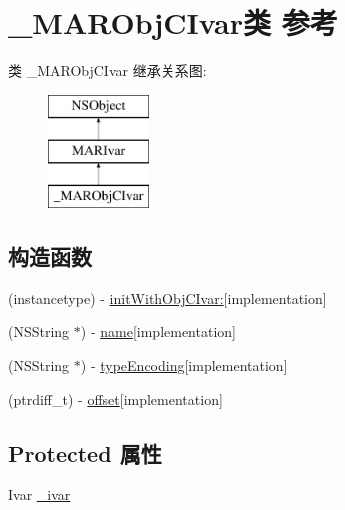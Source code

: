 \hypertarget{interface___m_a_r_obj_c_ivar}{}\section{\+\_\+\+M\+A\+R\+Obj\+C\+Ivar类 参考}
\label{interface___m_a_r_obj_c_ivar}
类 \+\_\+\+M\+A\+R\+Obj\+C\+Ivar 继承关系图\+:\begin{figure}[H]
\begin{center}
\leavevmode
\includegraphics[height=3.000000cm]{interface___m_a_r_obj_c_ivar}
\end{center}
\end{figure}
\subsection*{构造函数}
\begin{DoxyCompactItemize}
\item 
(instancetype) -\/ \hyperlink{interface___m_a_r_obj_c_ivar_ac3cd7d9e7fe7a418d46bd4d9e216e351}{init\+With\+Obj\+C\+Ivar\+:}{\ttfamily  \mbox{[}implementation\mbox{]}}
\item 
(N\+S\+String $\ast$) -\/ \hyperlink{interface___m_a_r_obj_c_ivar_a43dde43f4f9f5a541d420d49948e55c4}{name}{\ttfamily  \mbox{[}implementation\mbox{]}}
\item 
(N\+S\+String $\ast$) -\/ \hyperlink{interface___m_a_r_obj_c_ivar_ad2feb85addee2dd039ded28972747c0c}{type\+Encoding}{\ttfamily  \mbox{[}implementation\mbox{]}}
\item 
(ptrdiff\+\_\+t) -\/ \hyperlink{interface___m_a_r_obj_c_ivar_a5dd2fd37ed0c072ef07b1d2a8edf37bb}{offset}{\ttfamily  \mbox{[}implementation\mbox{]}}
\end{DoxyCompactItemize}
\subsection*{Protected 属性}
\begin{DoxyCompactItemize}
\item 
Ivar \hyperlink{interface___m_a_r_obj_c_ivar_ab85a54615dd3981ba5ac91e12decaae0}{\+\_\+ivar}
\end{DoxyCompactItemize}
